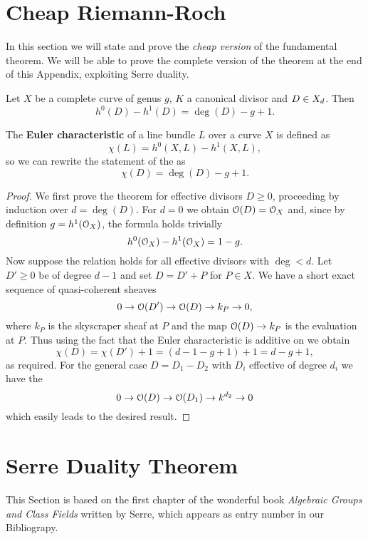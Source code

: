 \section{Cheap Riemann-Roch}
	In this section we will state and prove the \emph{cheap version} of the fundamental \RR theorem. We will be able to prove the complete version of the theorem at the end of this Appendix, exploiting Serre duality.
	\begin{namedtheo}\label{thm:cheap_RR}
		Let $X$ be a complete curve of genus $g$, $K$ a canonical divisor and $D\in X_d$. Then
		$$ h^0(D) - h^1(D) = \deg(D)-g+1. $$
	\end{namedtheo}
	\begin{rema}
		The \textbf{Euler characteristic} of a line bundle $L$ over a curve $X$ is defined as
		$$ \chi(L) = h^0(X,L) - h^1(X,L), $$
		so we can rewrite the statement of the \RR as
		$$ \chi(D) = \deg(D) - g + 1. $$
	\end{rema}
	\begin{proof}
		We first prove the theorem for effective divisors $D\geq 0$, proceeding by induction over $d=\deg(D)$. For $d=0$ we obtain $\mathcal{O}(D)=\mathcal{O}_X$ and, since by definition $g=h^1(\mathcal{O}_X)$, the formula holds trivially
		$$ h^0(\mathcal{O}_X) - h^1(\mathcal{O}_X) = 1-g. $$
		Now suppose the relation holds for all effective divisors with $\deg<d$. Let $D'\geq 0$ be of degree $d-1$ and set $D=D'+P$ for $P\in X$. We have a short exact sequence of quasi-coherent sheaves
		$$ 0 \to \mathcal{O}(D') \to \mathcal{O}(D) \to k_P \to 0, $$
		where $k_P$ is the skyscraper sheaf at $P$ and the map ${\mathcal{O}(D)}\to{k_P}$ is the evaluation at $P$. Thus using the fact that the Euler characteristic is additive on \sess we obtain
		$$ \chi(D) = \chi(D') + 1 = (d-1-g+1) + 1 = d-g+1, $$
		as required. For the general case $D=D_1-D_2$ with $D_i$ effective of degree $d_i$ we have the \ses
		$$ 0 \to \mathcal{O}(D) \to \mathcal{O}(D_1) \to k^{d_2} \to 0 $$
		which easily leads to the desired result.
	\end{proof}

\section{Serre Duality Theorem}\label{sec:Serre_duality}

	This Section is based on the first chapter of the wonderful book \emph{Algebraic Groups and Class Fields} written by Serre, which appears as entry number \cite{SERRE} in our Bibliograpy.\\

